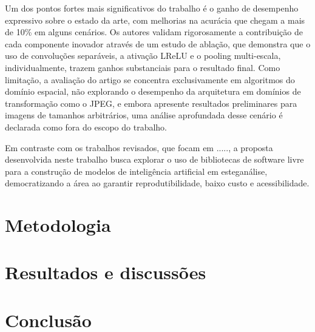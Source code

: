 \documentclass[12pt]{article}
\begin{document}
Um dos pontos fortes mais significativos do trabalho é o ganho de desempenho expressivo sobre o estado da arte, com melhorias na acurácia que chegam a mais de 10\% 
em alguns cenários. Os autores validam rigorosamente a contribuição de cada componente inovador através de um estudo de ablação, que demonstra que o uso de convoluções separáveis, a ativação LReLU e o pooling multi-escala, individualmente, trazem ganhos substanciais para o resultado final. Como limitação, a avaliação do artigo se concentra exclusivamente em algoritmos do domínio espacial, não explorando o desempenho da arquitetura em domínios de transformação como o JPEG, e embora apresente resultados preliminares para imagens de tamanhos arbitrários, uma análise aprofundada desse cenário é declarada como fora do escopo do trabalho.

Em contraste com os trabalhos revisados, que focam em .....,  a proposta desenvolvida neste trabalho
busca explorar o uso de bibliotecas de software livre para a construção de
modelos de inteligência artificial em esteganálise, democratizando a área ao
garantir reprodutibilidade, baixo custo e acessibilidade.

\section{Metodologia}

\section{Resultados e discussões}

\section{Conclusão}\label{sec:figs}






\end{document}
